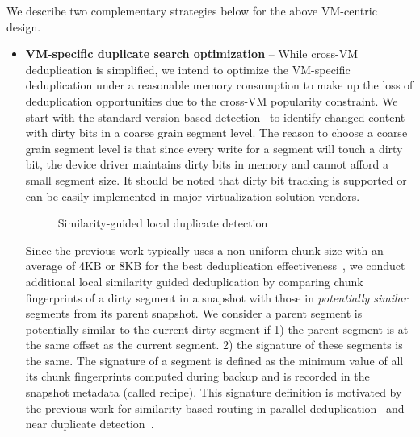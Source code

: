 We describe two  complementary strategies below for the above  VM-centric design.
\begin{itemize}
\item 
\textbf{VM-specific duplicate search optimization} --
While cross-VM deduplication is simplified, we intend to optimize the VM-specific deduplication 
under a reasonable memory consumption
 to make up the loss of deduplication opportunities due to the cross-VM popularity constraint.
We start with the standard version-based detection~\cite{Clements2009,Vrable2009}
to identify changed content with dirty bits in a coarse grain segment level.
The reason to choose a coarse grain segment level is that 
since every write for a segment will touch a dirty bit, the device driver maintains dirty bits in 
memory and cannot afford a small segment size.
It should be noted that dirty bit tracking is supported or can be easily implemented in 
major virtualization solution vendors. 

\begin{figure}[htbp]
  \centering
  \caption{Similarity-guided local duplicate detection}
  \label{fig:local_dedup}
\end{figure}

Since the previous work typically uses a non-uniform chunk size 
with an average of 4KB or 8KB for the best deduplication 
effectiveness~\cite{Guo2011,extreme_binning09,bottleneck08,Dong2011},
we conduct additional local similarity guided deduplication 
by comparing chunk fingerprints of a dirty segment in a snapshot 
with those in  {\em potentially similar} segments from its parent snapshot. 
We consider a parent  segment is  potentially similar to the current dirty segment if 1) the parent segment
is at the same offset as the current segment.
2) the signature of these segments is the same.
The signature of a segment is defined as the minimum value of all its chunk fingerprints 
computed during backup and is recorded in the snapshot metadata (called recipe). 
This signature definition is motivated by the previous work for similarity-based routing in parallel
deduplication~\cite{extreme_binning09,Dong2011} and near duplicate detection~\cite{shingling97}. 




\end{itemize}
